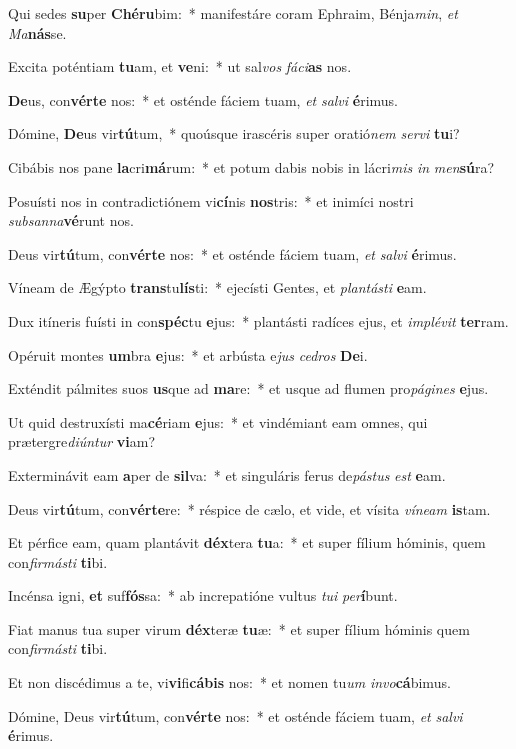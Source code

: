 \item Qui sedes \textbf{su}per \textbf{Ché}\textbf{ru}bim:~* manifestáre coram Ephraim, Bénja\textit{min}, \textit{et} \textit{Ma}\textbf{nás}se.
\item Excita poténtiam \textbf{tu}am, et \textbf{ve}ni:~* ut sal\textit{vos} \textit{fá}\textit{ci}\textbf{as} nos.
\item \textbf{De}us, con\textbf{vér}\textbf{te} nos:~* et osténde fáciem tuam, \textit{et} \textit{sal}\textit{vi} \textbf{é}rimus.
\item Dómine, \textbf{De}us vir\textbf{tú}tum,~* quoúsque irascéris super oratió\textit{nem} \textit{ser}\textit{vi} \textbf{tu}i?
\item Cibábis nos pane \textbf{la}cri\textbf{má}rum:~* et potum dabis nobis in lácri\textit{mis} \textit{in} \textit{men}\textbf{sú}ra?
\item Posuísti nos in contradictiónem vi\textbf{cí}nis \textbf{nos}tris:~* et inimíci nostri \textit{sub}\textit{san}\textit{na}\textbf{vé}runt nos.
\item Deus vir\textbf{tú}tum, con\textbf{vér}\textbf{te} nos:~* et osténde fáciem tuam, \textit{et} \textit{sal}\textit{vi} \textbf{é}rimus.
\item Víneam de Ægýpto \textbf{trans}tu\textbf{lís}ti:~* ejecísti Gentes, et \textit{plan}\textit{tás}\textit{ti} \textbf{e}am.
\item Dux itíneris fuísti in con\textbf{spéc}tu \textbf{e}jus:~* plantásti radíces ejus, et \textit{im}\textit{plé}\textit{vit} \textbf{ter}ram.
\item Opéruit montes \textbf{um}bra \textbf{e}jus:~* et arbústa e\textit{jus} \textit{ce}\textit{dros} \textbf{De}i.
\item Exténdit pálmites suos \textbf{us}que ad \textbf{ma}re:~* et usque ad flumen pro\textit{pá}\textit{gi}\textit{nes} \textbf{e}jus.
\item Ut quid destruxísti ma\textbf{cé}riam \textbf{e}jus:~* et vindémiant eam omnes, qui prætergre\textit{di}\textit{ún}\textit{tur} \textbf{vi}am?
\item Exterminávit eam \textbf{a}per de \textbf{sil}va:~* et singuláris ferus de\textit{pás}\textit{tus} \textit{est} \textbf{e}am.
\item Deus vir\textbf{tú}tum, con\textbf{vér}\textbf{te}re:~* réspice de cælo, et vide, et vísita \textit{ví}\textit{ne}\textit{am} \textbf{is}tam.
\item Et pérfice eam, quam plantávit \textbf{déx}tera \textbf{tu}a:~* et super fílium hóminis, quem con\textit{fir}\textit{más}\textit{ti} \textbf{ti}bi.
\item Incénsa igni, \textbf{et} suf\textbf{fós}sa:~* ab increpatióne vultus \textit{tu}\textit{i} \textit{per}\textbf{í}bunt.
\item Fiat manus tua super virum \textbf{déx}teræ \textbf{tu}æ:~* et super fílium hóminis quem con\textit{fir}\textit{más}\textit{ti} \textbf{ti}bi.
\item Et non discédimus a te, vi\textbf{vi}fi\textbf{cá}\textbf{bis} nos:~* et nomen tu\textit{um} \textit{in}\textit{vo}\textbf{cá}bimus.
\item Dómine, Deus vir\textbf{tú}tum, con\textbf{vér}\textbf{te} nos:~* et osténde fáciem tuam, \textit{et} \textit{sal}\textit{vi} \textbf{é}rimus.
